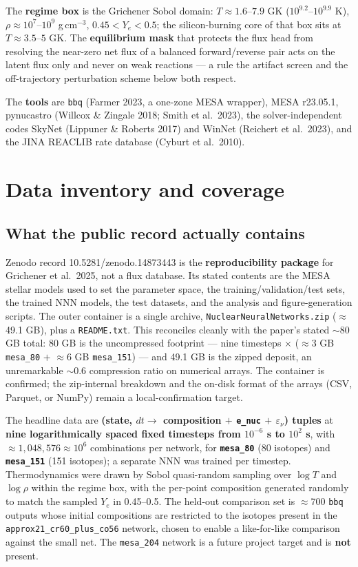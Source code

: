 \documentclass[11pt]{article}
\newcommand{\bbq}{\texttt{bbq}}
\begin{document}
The \textbf{regime box} is the Grichener Sobol domain: $T \approx 1.6$--$7.9$ GK ($10^{9.2}$--$10^{9.9}$ K), $\rho \approx 10^7$--$10^9$ g\,cm$^{-3}$, $0.45 < Y_e < 0.5$; the silicon-burning core of that box sits at $T \approx 3.5$--$5$ GK. The \textbf{equilibrium mask} that protects the flux head from resolving the near-zero net flux of a balanced forward/reverse pair acts on the latent flux only and never on weak reactions --- a rule the artifact screen and the off-trajectory perturbation scheme below both respect.

The \textbf{tools} are \bbq{} (Farmer 2023, a one-zone MESA wrapper), MESA r23.05.1, pynucastro (Willcox \& Zingale 2018; Smith et al.\ 2023), the solver-independent codes SkyNet (Lippuner \& Roberts 2017) and WinNet (Reichert et al.\ 2023), and the JINA REACLIB rate database (Cyburt et al.\ 2010).

\section{Data inventory and coverage}

\subsection{What the public record actually contains}

Zenodo record 10.5281/zenodo.14873443 is the \textbf{reproducibility package} for Grichener et al.\ 2025, not a flux database. Its stated contents are the MESA stellar models used to set the parameter space, the training/validation/test sets, the trained NNN models, the test datasets, and the analysis and figure-generation scripts. The outer container is a single archive, \texttt{NuclearNeuralNetworks.zip} ($\approx$49.1 GB), plus a \texttt{README.txt}. This reconciles cleanly with the paper's stated $\sim$80 GB total: 80 GB is the uncompressed footprint --- nine timesteps $\times$ ($\approx$3 GB \texttt{mesa\_80} $+$ $\approx$6 GB \texttt{mesa\_151}) --- and 49.1 GB is the zipped deposit, an unremarkable $\sim$0.6 compression ratio on numerical arrays. The container is confirmed; the zip-internal breakdown and the on-disk format of the arrays (CSV, Parquet, or NumPy) remain a local-confirmation target.

The headline data are \textbf{(state, $dt \to$ composition $+$ \texttt{e\_nuc} $+$ $\varepsilon_\nu$) tuples} at \textbf{nine logarithmically spaced fixed timesteps from $10^{-6}$ s to $10^2$ s}, with $\approx 1{,}048{,}576 \approx 10^6$ combinations per network, for \textbf{\texttt{mesa\_80}} (80 isotopes) and \textbf{\texttt{mesa\_151}} (151 isotopes); a separate NNN was trained per timestep. Thermodynamics were drawn by Sobol quasi-random sampling over $\log T$ and $\log \rho$ within the regime box, with the per-point composition generated randomly to match the sampled $Y_e$ in 0.45--0.5. The held-out comparison set is $\approx$700 \bbq{} outputs whose initial compositions are restricted to the isotopes present in the \texttt{approx21\_cr60\_plus\_co56} network, chosen to enable a like-for-like comparison against the small net. The \texttt{mesa\_204} network is a future project target and is \textbf{not} present.
\end{document}
